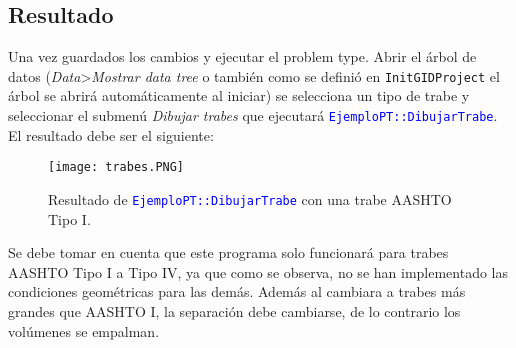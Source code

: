 \documentclass[10pt, a4paper, twocolumn]{article} %
\begin{document}
\subsection{Resultado}

Una vez guardados los cambios y ejecutar el problem type. Abrir el árbol de datos (\textit{Data}>\textit{Mostrar data tree} o también como se definió en \texttt{InitGIDProject} el árbol se abrirá automáticamente al iniciar) se selecciona un tipo de trabe y seleccionar el submenú \textit{Dibujar trabes} que ejecutará \textcolor{blue}{\texttt{EjemploPT::DibujarTrabe}}. El resultado debe ser el siguiente:

\begin{figure}[hbt!]\centering
	\texttt{[image: trabes.PNG]}
	\label{fig:lista_desplegable}
	\caption{Resultado de \textcolor{blue}{\texttt{EjemploPT::DibujarTrabe}} con una trabe AASHTO Tipo I.}
\end{figure}

Se debe tomar en cuenta que este programa solo funcionará para trabes AASHTO Tipo I a Tipo IV, ya que como se observa, no se han implementado las condiciones geométricas para las demás. Además al cambiara a trabes más grandes que AASHTO I, la separación debe cambiarse, de lo contrario los volúmenes se empalman.




\appendix
\end{document}

